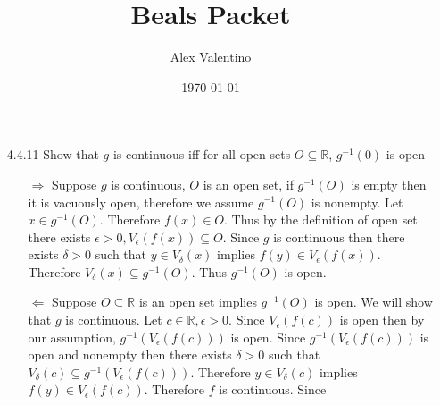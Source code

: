 \documentclass[12pt, letterpaper]{article}
\date{\today}
\author{Alex Valentino}
\title{Beals Packet}
\newcommand{\R}{\mathbb{R}}
\begin{document}
\begin{enumerate}
	\item[4.4.11] Show that $g$ is continuous iff for all open sets $O \subseteq \R$, $g^{-1}(0)$ is open\\
	\begin{itemize}
		\item[$\Rightarrow$] Suppose $g$ is continuous, $O$ is an open set, if $g^{-1}(O)$ is empty then it is vacuously open, therefore we assume $g^{-1}(O)$ is nonempty.  Let $x \in g^{-1}(O)$.  Therefore $f(x) \in O$.  Thus by the definition of open set there exists $\epsilon > 0, V_\epsilon(f(x)) \subseteq O$.  Since $g$ is continuous then there exists $\delta > 0$ such that $y \in V_\delta(x)$ implies $f(y) \in V_\epsilon(f(x))$.  Therefore $V_\delta(x) \subseteq g^{-1}(O)$.
		Thus $g^{-1}(O)$ is open.
		\item[$\Leftarrow$] Suppose $O \subseteq \R$ is an open set implies $g^{-1}(O)$ is open.  We will show that 
		$g$ is continuous.  Let $c \in \R, \epsilon >0$.  Since $V_\epsilon(f(c))$ is open then by our assumption, 
		$g^{-1}(V_\epsilon(f(c)))$ is open.  Since $g^{-1}(V_\epsilon(f(c)))$ is open and nonempty then there exists $\delta > 0$ such that $V_\delta(c) \subseteq g^{-1}(V_\epsilon(f(c)))$.  Therefore $y \in V_\delta(c)$ implies $f(y) \in V_\epsilon(f(c))$.  Therefore $f$ is continuous.   
		Since $$
	\end{itemize}
\end{enumerate}
\end{document}
